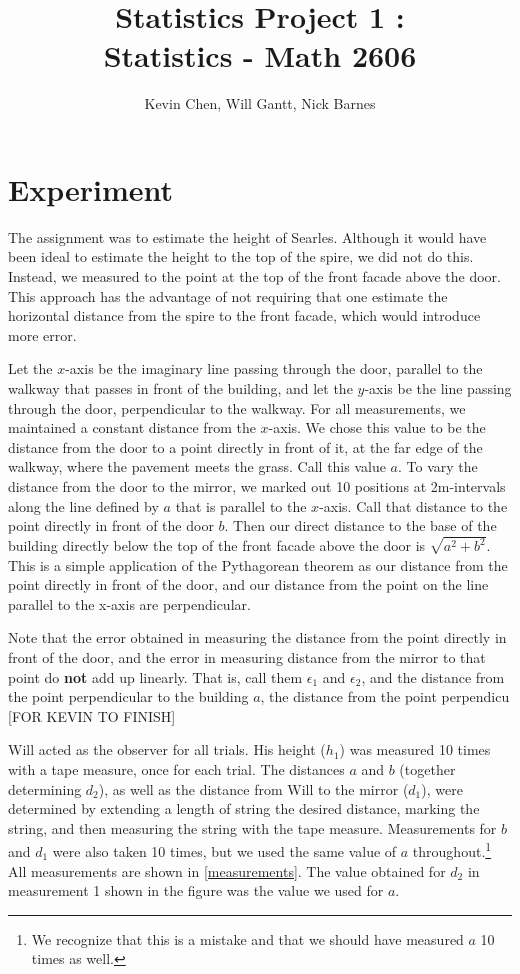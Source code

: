 \documentclass[11pt]{article}
\title{Statistics Project 1 : \\ Statistics - Math 2606}
\author{Kevin Chen, Will Gantt, Nick Barnes}
\date{}
\begin{document}
\maketitle
\section{Experiment}

The assignment was to estimate the height of Searles. Although it would have been ideal to estimate the height to the top of the spire, we did not do this. Instead, we measured to the point at the top of the front facade above the door. This approach has the advantage of not requiring that one estimate the horizontal distance from the spire to the front facade, which would introduce more error.

Let the $x$-axis be the imaginary line passing through the door, parallel to the walkway that passes in front of the building, and let the $y$-axis be the line passing through the door, perpendicular to the walkway. For all measurements, we maintained a constant distance from the $x$-axis. We chose this value to be the distance from the door to a point directly in front of it, at the far edge of the walkway, where the pavement meets the grass. Call this value $a$. To vary the distance from the door to the mirror, we marked out 10 positions at 2m-intervals along the line defined by $a$ that is parallel to the $x$-axis. Call that distance to the point directly in front of the door $b$. Then our direct distance to the base of the building directly below the top of the front facade above the door is $\sqrt{a^2+b^2}$. This is a simple application of the Pythagorean theorem as our distance from the point directly in front of the door, and our distance from the point on the line parallel to the x-axis are perpendicular. 

Note that the error obtained in measuring the distance from the point directly in front of the door, and the error in measuring distance from the mirror to that point do \textbf{not} add up linearly. That is, call them $\epsilon_1$ and $\epsilon_2$, and the distance from the point perpendicular to the building $a$, the distance from the point perpendicu [FOR KEVIN TO FINISH]

Will acted as the observer for all trials. His height ($h_1$) was measured 10 times with a tape measure, once for each trial. The distances $a$ and $b$ (together determining $d_2$), as well as the distance from Will to the mirror ($d_1$), were determined by extending a length of string the desired distance, marking the string, and then measuring the string with the tape measure. Measurements for $b$ and $d_1$ were also taken 10 times, but we used the same value of $a$ throughout.\footnote{We recognize that this is a mistake and that we should have measured $a$ 10 times as well.} All measurements are shown in \ref{measurements}. The value obtained for $d_2$ in measurement 1 shown in the figure was the value we used for $a$.
\end{document}
